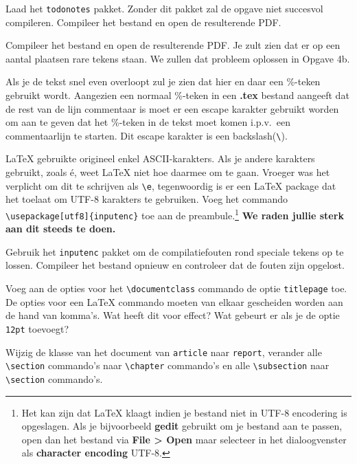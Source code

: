 \documentclass[12pt, dutch]{article}
\newcommand{\bs}{\textbackslash}
\begin{document}
\begin{tcolorbox}[title=Opgave 3]
  Laad het \texttt{todonotes} pakket. Zonder dit pakket zal de opgave niet
  succesvol compileren. Compileer het bestand en open de resulterende PDF.
\end{tcolorbox}


\begin{tcolorbox}[title=Opgave 4a]
  Compileer het bestand en open de resulterende PDF. Je zult zien dat er op
  een aantal plaatsen rare tekens staan. We zullen dat probleem oplossen
  in Opgave 4b.
\end{tcolorbox}

Als je de tekst snel even overloopt zul je zien dat hier en daar een
\%-teken gebruikt wordt. Aangezien een normaal \%-teken in een \textbf{.tex}
bestand aangeeft dat de rest van de lijn commentaar is moet er een
escape karakter gebruikt worden om aan te geven dat het \%-teken in
de tekst moet komen i.p.v.\ een commentaarlijn te starten.  Dit
escape karakter is een backslash(\texttt{\bs}).

\LaTeX{} gebruikte origineel enkel ASCII-karakters. Als je andere karakters
gebruikt, zoals \'e, weet \LaTeX{} niet hoe daarmee om te gaan. Vroeger was het
verplicht om dit te schrijven als \texttt{\bs\textquotesingle{}e}, tegenwoordig
is er een \LaTeX{} package dat het toelaat om UTF-8 karakters te gebruiken. Voeg het commando
\texttt{\bs{}usepackage[utf8]\{inputenc\}} toe aan de preambule.\footnote{Het
  kan zijn dat \LaTeX{} klaagt indien je bestand niet in UTF-8 encodering is
  opgeslagen. Als je bijvoorbeeld \textbf{gedit} gebruikt om je bestand aan te
  passen, open dan het bestand via \textbf{File > Open} maar selecteer in het
  dialoogvenster als \textbf{character encoding} UTF-8.} \textbf{We raden
  jullie sterk aan dit steeds te doen.}

\begin{tcolorbox}[title=Opgave 4b]
  Gebruik het \texttt{inputenc} pakket om de compilatiefouten rond speciale tekens op
  te lossen. Compileer het bestand opnieuw en controleer dat de fouten zijn
  opgelost.
\end{tcolorbox}


\begin{tcolorbox}[title=Opgave 4c]
  Voeg aan de opties voor het \texttt{\bs{}documentclass} commando de
  optie \texttt{titlepage} toe.  De opties voor een \LaTeX{} commando
  moeten van elkaar gescheiden worden aan de hand van komma's.  Wat
  heeft dit voor effect?  Wat gebeurt er als je de optie \texttt{12pt}
  toevoegt?
\end{tcolorbox}
\begin{tcolorbox}[title=Opgave 4d]
  Wijzig de klasse van het document van \texttt{article} naar
  \texttt{report}, verander alle \texttt{\bs{}section} commando's naar
  \texttt{\bs{}chapter} commando's en alle \texttt{\bs{}subsection} naar
  \texttt{\bs{}section} commando's.
\end{tcolorbox}
\end{document}
